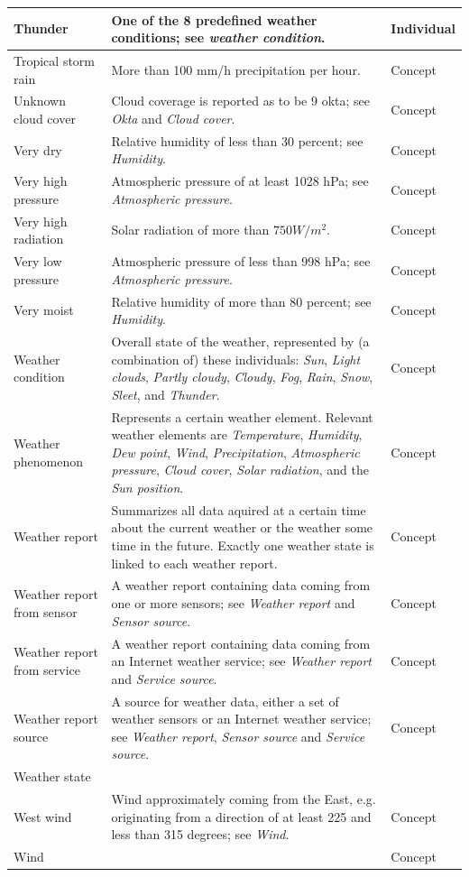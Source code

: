 \begin{longtable}{|p{}|p{}|p{}|}
  \hline
  Thunder & One of the 8 predefined weather conditions; see \emph{weather condition}. & Individual \\
  \hline
  Tropical storm rain & More than 100 mm/h precipitation per hour. & Concept \\
  \hline
  Unknown cloud cover & Cloud coverage is reported as to be 9 okta; see \emph{Okta} and \emph{Cloud cover}. & Concept \\
  \hline
  Very dry & Relative humidity of less than 30 percent; see \emph{Humidity}. & Concept \\
  \hline
  Very high pressure & Atmospheric pressure of at least 1028 hPa; see \emph{Atmospheric pressure}. & Concept \\
  \hline
  Very high radiation & Solar radiation of more than $750 W/m^2$. & Concept \\
  \hline
  Very low pressure & Atmospheric pressure of less than 998 hPa; see \emph{Atmospheric pressure}. & Concept \\
  \hline
  Very moist & Relative humidity of more than 80 percent; see \emph{Humidity}. & Concept \\
  \hline
  Weather condition & Overall state of the weather, represented by (a combination of) these individuals: \emph{Sun}, \emph{Light clouds}, \emph{Partly cloudy}, \emph{Cloudy}, \emph{Fog}, \emph{Rain}, \emph{Snow}, \emph{Sleet}, and \emph{Thunder}. & Concept \\
  \hline
  Weather phenomenon & Represents a certain weather element. Relevant weather elements are \emph{Temperature}, \emph{Humidity}, \emph{Dew point}, \emph{Wind}, \emph{Precipitation}, \emph{Atmospheric pressure}, \emph{Cloud cover}, \emph{Solar radiation}, and the \emph{Sun position}. & Concept \\
  \hline
  Weather report & Summarizes all data aquired at a certain time about the current weather or the weather some time in the future. Exactly one weather state is linked to each weather report. & Concept \\ %
  \hline
  Weather report from sensor & A weather report containing data coming from one or more sensors; see \emph{Weather report} and \emph{Sensor source}. & Concept \\
  \hline
  Weather report from service & A weather report containing data coming from an Internet weather service; see \emph{Weather report} and \emph{Service source}. & Concept \\
  \hline
  Weather report source & A source for weather data, either a set of weather sensors or an Internet weather service; see \emph{Weather report}, \emph{Sensor source} and \emph{Service source}. & Concept \\
  \hline
  Weather state & & \\
  \hline
  West wind & Wind approximately coming from the East, e.g. originating from a direction of at least 225 and less than 315 degrees; see \emph{Wind}. & Concept \\
  \hline
  Wind & & Concept \\ %
  \hline
\end{longtable}

